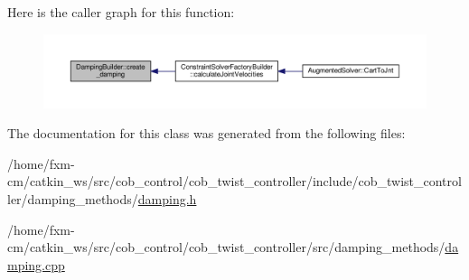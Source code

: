 Here is the caller graph for this function\-:
\nopagebreak
\begin{figure}[H]
\begin{center}
\leavevmode
\includegraphics[width=350pt]{classDampingBuilder_a15f58f4523f13e73897fc6114c322fee_icgraph}
\end{center}
\end{figure}




The documentation for this class was generated from the following files\-:\begin{DoxyCompactItemize}
\item 
/home/fxm-\/cm/catkin\-\_\-ws/src/cob\-\_\-control/cob\-\_\-twist\-\_\-controller/include/cob\-\_\-twist\-\_\-controller/damping\-\_\-methods/\hyperlink{damping_8h}{damping.\-h}\item 
/home/fxm-\/cm/catkin\-\_\-ws/src/cob\-\_\-control/cob\-\_\-twist\-\_\-controller/src/damping\-\_\-methods/\hyperlink{damping_8cpp}{damping.\-cpp}\end{DoxyCompactItemize}
